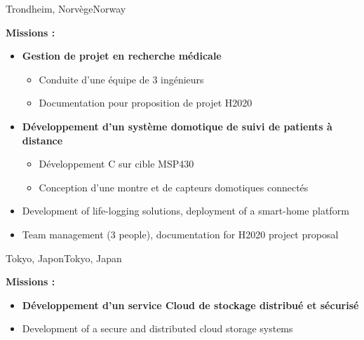 \vspace{\ItemsSpacing}

{}{}{Trondheim, \ifnativelang Norv\`ege\else Norway \fi}{
\textcolor{color1}{\textbf{Missions :}}
\begin{itemize}
\ifnativelang
\item \textbf{Gestion de projet en recherche m\'edicale}
\begin{itemize}
\item Conduite d'une équipe de 3 ingénieurs
\item Documentation pour proposition de projet H2020
\end{itemize}
\item \textbf{Développement d’un système domotique de suivi de patients à distance}
\begin{itemize}
\item Développement C sur cible MSP430
\item Conception d'une montre et de capteurs domotiques connect\'es
\end{itemize}
\else
\item Development of life-logging solutions, deployment of a smart-home platform
\item Team management (3 people), documentation for H2020 project proposal
\fi
\end{itemize}
}


\vspace{\ItemsSpacing}

{}{}{\ifnativelang Tokyo, Japon\else Tokyo, Japan\fi}{
\textcolor{color1}{\textbf{Missions :}}
\begin{itemize}
\ifnativelang
\item \textbf{D\'eveloppement d'un service Cloud de stockage distribu\'e et s\'ecuris\'e}
\else
\item Development of a secure and distributed cloud storage systems
\fi
\end{itemize}
}

